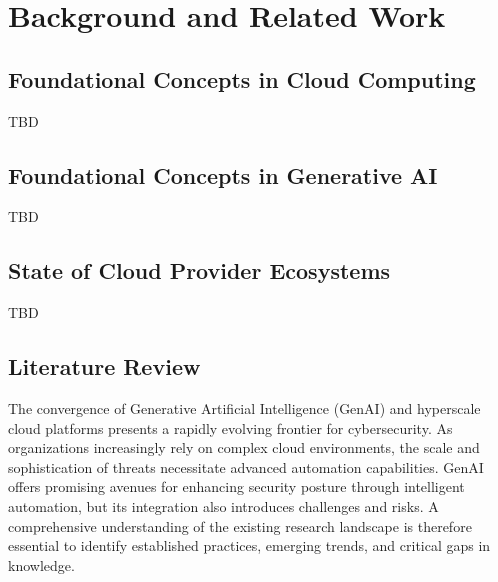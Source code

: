 
\chapter{Background and Related Work} %
\label{chap:Background and Related Work}

\section{Foundational Concepts in Cloud Computing} %
\label{sec:Foundational Concepts in Cloud Computing}

TBD


\section{Foundational Concepts in Generative AI} %
\label{sec:Foundational Concepts in Generative AI}

TBD


\section{State of Cloud Provider Ecosystems} %
\label{sec:State of Cloud Provider Ecosystems}

TBD


\section{Literature Review} %
\label{sec:Literature Review}

The convergence of Generative Artificial Intelligence (GenAI) and hyperscale cloud platforms presents a rapidly evolving frontier for cybersecurity. As organizations increasingly rely on complex cloud environments, the scale and sophistication of threats necessitate advanced automation capabilities. GenAI offers promising avenues for enhancing security posture through intelligent automation, but its integration also introduces challenges and risks. A comprehensive understanding of the existing research landscape is therefore essential to identify established practices, emerging trends, and critical gaps in knowledge.

